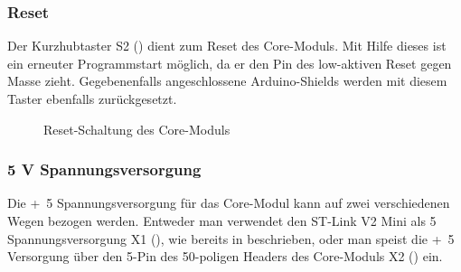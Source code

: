 \subsubsection{Reset}
Der Kurzhubtaster S2 () dient zum Reset des \gls{Core-Modul}s. Mit Hilfe dieses ist ein erneuter Programmstart möglich, da er den Pin des low-aktiven Reset gegen Masse zieht. Gegebenenfalls angeschlossene Arduino-Shields werden mit diesem Taster ebenfalls zurückgesetzt.

\begin{figure}[H]
    \centering
    \qquad
    \qquad
    \caption[Reset-Schaltung des Core-Moduls]{Reset-Schaltung des \gls{Core-Modul}s}
    \label{fig:coremodul-reset}
\end{figure}

\subsubsection{5 V Spannungsversorgung}
Die \unit{+5}{\volt} Spannungsversorgung für das \gls{Core-Modul} kann auf zwei verschiedenen Wegen bezogen werden. Entweder man verwendet den ST-Link V2 Mini als \unit{5}{\volt} Spannungsversorgung X1 (), wie bereits in  beschrieben, oder man speist die \unit{+5}{\volt} Versorgung über den \unit{5}{\volt}-Pin des 50-poligen Headers des \gls{Core-Modul}s X2 () ein.

